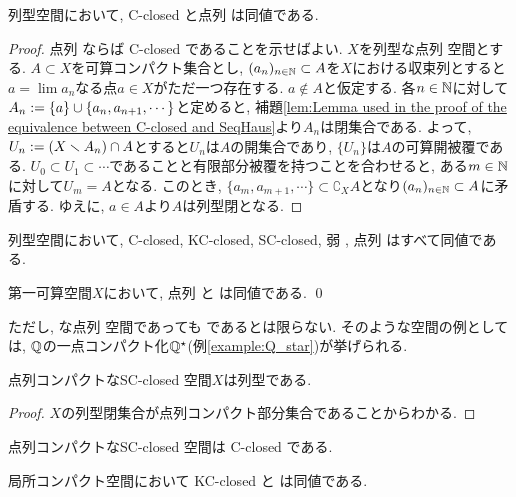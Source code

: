 \documentclass[uplatex, dvipdfmx, a4paper, 12pt, class=jsbook, crop=false]{standalone}
\begin{document}
\begin{proposition}
	列型空間において, C-closed と点列 \Hausdorff は同値である.
\end{proposition}

\begin{proof}
	点列 \Hausdorff ならば C-closed であることを示せばよい. $ X $を列型な点列 \Hausdorff 空間とする. $ A \subset X $を可算コンパクト集合とし, $ (a_n)_{n \in \mathbb{N}} \subset A $を$ X $における収束列とすると$ a = \lim a_n $なる点$  a \in X $がただ一つ存在する. $ a \notin A $と仮定する. 各$ n \in \mathbb{N} $に対して$ A_n \mathrel{:=} \{a\} \cup \{a_n, a_{n+1}, \cdots\} $と定めると, 補題\ref{lem:Lemma used in the proof of the equivalence between C-closed and SeqHaus}より$ A_n $は閉集合である. よって, $ U_n \mathrel{:=} (X \smallsetminus A_n) \cap A $とすると$ U_n $は$ A $の開集合であり, $ \{U_n\} $は$ A $の可算開被覆である. $ U_0 \subset U_1 \subset \cdots $であることと有限部分被覆を持つことを合わせると, ある$ m \in \mathbb{N} $に対して$ U_m = A $となる. このとき, $ \{a_m, a_{m+1}, \cdots\} \subset \complement_X A $となり$ (a_n)_{n \in \mathbb{N}}
	 \subset A $に矛盾する. ゆえに, $ a \in A $より$ A $は列型閉となる.
\end{proof}

\begin{corollary}
	列型空間において, C-closed, KC-closed, SC-closed, 弱 \Hausdorff, 点列 \Hausdorff はすべて同値である.
\end{corollary}

\begin{proposition}
	第一可算空間$ X $において, 点列 \Hausdorff と  は同値である. \qed
\end{proposition}

ただし, \Frechet な点列 \Hausdorff 空間であっても  であるとは限らない. そのような空間の例としては, $ \mathbb{Q} $の一点コンパクト化$ \mathbb{Q}^{\star} $(例\ref{example:Q_star})が挙げられる.

\begin{proposition}
	点列コンパクトなSC-closed 空間$ X $は列型である.
\end{proposition}

\begin{proof}
	$ X $の列型閉集合が点列コンパクト部分集合であることからわかる.
\end{proof}

\begin{proposition}
	点列コンパクトなSC-closed 空間は C-closed である.
\end{proposition}


\begin{proposition}
	局所コンパクト空間において KC-closed と は同値である.
\end{proposition}
\end{document}
